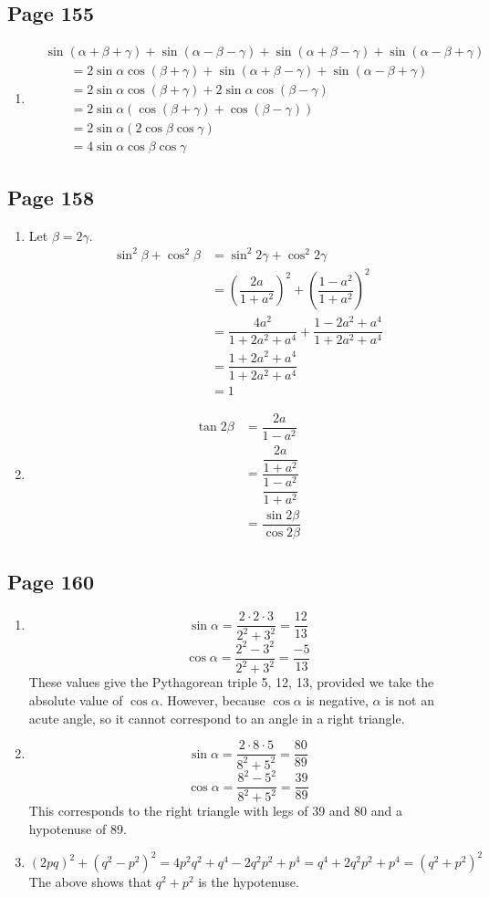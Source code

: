 \documentclass{article}
\newenvironment{solutions}[1]
{\subsection*{#1}
 \begin{enumerate}[leftmargin=1.5em]}
{\end{enumerate}}
\newcommand{\solution}{\item}
\begin{document}
\begin{solutions}{Page 155}
\solution %
\begin{align*}
&\sin\left(\alpha+\beta+\gamma\right) + \sin\left(\alpha-\beta-\gamma\right) + \sin\left(\alpha+\beta-\gamma\right) +
\sin\left(\alpha-\beta+\gamma\right) \\
&\qquad= 2\sin{\alpha}\cos\left(\beta+\gamma\right) + \sin\left(\alpha+\beta-\gamma\right) +
\sin\left(\alpha-\beta+\gamma\right) \\
&\qquad= 2\sin{\alpha}\cos\left(\beta+\gamma\right) + 2\sin{\alpha}\cos\left(\beta-\gamma\right) \\
&\qquad= 2\sin{\alpha}\left(\cos\left(\beta+\gamma\right) + \cos\left(\beta-\gamma\right)\right) \\
&\qquad= 2\sin{\alpha}\left(2\cos{\beta}\cos{\gamma}\right) \\
&\qquad= 4\sin{\alpha}\cos{\beta}\cos{\gamma}
\end{align*}
\end{solutions}

\begin{solutions}{Page 158}
\solution %
Let $\beta=2\gamma$.
\begin{align*}
\sin^{2}{\beta} + \cos^{2}{\beta} &= \sin^{2}{2\gamma} + \cos^{2}{2\gamma} \\
&= \left(\dfrac{2a}{1+a^{2}}\right)^2 + \left(\dfrac{1-a^{2}}{1+a^{2}}\right)^2 \\
&= \dfrac{4a^{2}}{1+2a^{2}+a^{4}} + \dfrac{1-2a^{2}+a^{4}}{1+2a^{2}+a^{4}} \\
&= \dfrac{1+2a^{2}+a^{4}}{1+2a^{2}+a^{4}} \\
&= 1
\end{align*}

\solution %
\begin{align*}
\tan{2\beta} &= \dfrac{2a}{1-a^2} \\
&= \dfrac{\dfrac{2a}{1+a^{2}}}{\dfrac{1-a^{2}}{1+a^{2}}} \\
&= \dfrac{\sin{2\beta}}{\cos{2\beta}}
\end{align*}
\end{solutions}

\begin{solutions}{Page 160}
\solution %
\[
\sin{\alpha} = \dfrac{2 \cdot 2 \cdot 3}{2^{2}+3^{2}} = \dfrac{12}{13}
\]
\[
\cos{\alpha} = \dfrac{2^{2} - 3^{2}}{2^{2}+3^{2}} = \dfrac{-5}{13}
\]
These values give the Pythagorean triple 5, 12, 13, provided we take the absolute value of $\cos{\alpha}$. However, because $\cos{\alpha}$ is negative, $\alpha$ is not an acute angle, so it cannot correspond to an angle in a right triangle.

\solution %
\[
\sin{\alpha} = \dfrac{2 \cdot 8 \cdot 5}{8^{2}+5^{2}} = \dfrac{80}{89}
\]
\[
\cos{\alpha} = \dfrac{8^{2} - 5^{2}}{8^{2}+5^{2}} = \dfrac{39}{89}
\]
This corresponds to the right triangle with legs of 39 and 80 and a hypotenuse of 89.

\solution %
\[
\left(2pq\right)^{2} + \left(q^{2}-p^{2}\right)^{2} = 4p^{2}q^{2} + q^4 - 2q^{2}p^{2} + p^{4} = q^{4} + 2q^{2}p^{2} + p^{4} = \left(q^{2}+p^{2}\right)^{2}
\]
The above shows that $q^{2}+p^{2}$ is the hypotenuse.

\end{solutions}
\end{document}
